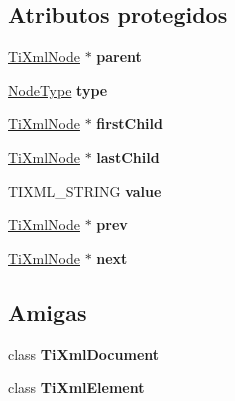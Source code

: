 \subsection*{\-Atributos protegidos}
\begin{DoxyCompactItemize}
\item 
\hypertarget{classTiXmlNode_a662c4de61244e4fa5bd4e2d8c63143a5}{\hyperlink{classTiXmlNode}{\-Ti\-Xml\-Node} $\ast$ {\bfseries parent}}\label{classTiXmlNode_a662c4de61244e4fa5bd4e2d8c63143a5}

\item 
\hypertarget{classTiXmlNode_a2619c6379181c16ba95ae6922e2ca839}{\hyperlink{classTiXmlNode_a836eded4920ab9e9ef28496f48cd95a2}{\-Node\-Type} {\bfseries type}}\label{classTiXmlNode_a2619c6379181c16ba95ae6922e2ca839}

\item 
\hypertarget{classTiXmlNode_af749fb7f22010b80e8f904c32653d50e}{\hyperlink{classTiXmlNode}{\-Ti\-Xml\-Node} $\ast$ {\bfseries first\-Child}}\label{classTiXmlNode_af749fb7f22010b80e8f904c32653d50e}

\item 
\hypertarget{classTiXmlNode_a5b30756d21b304580d22a841ec9d61f8}{\hyperlink{classTiXmlNode}{\-Ti\-Xml\-Node} $\ast$ {\bfseries last\-Child}}\label{classTiXmlNode_a5b30756d21b304580d22a841ec9d61f8}

\item 
\hypertarget{classTiXmlNode_aead528b3cedc33c16a6c539872c7cc8b}{\-T\-I\-X\-M\-L\-\_\-\-S\-T\-R\-I\-N\-G {\bfseries value}}\label{classTiXmlNode_aead528b3cedc33c16a6c539872c7cc8b}

\item 
\hypertarget{classTiXmlNode_a9c5370ea2cbfd9f0e0f7b30a57fd68f5}{\hyperlink{classTiXmlNode}{\-Ti\-Xml\-Node} $\ast$ {\bfseries prev}}\label{classTiXmlNode_a9c5370ea2cbfd9f0e0f7b30a57fd68f5}

\item 
\hypertarget{classTiXmlNode_a2f329cc993d2d34df76e17dcbb776b45}{\hyperlink{classTiXmlNode}{\-Ti\-Xml\-Node} $\ast$ {\bfseries next}}\label{classTiXmlNode_a2f329cc993d2d34df76e17dcbb776b45}

\end{DoxyCompactItemize}
\subsection*{\-Amigas}
\begin{DoxyCompactItemize}
\item 
\hypertarget{classTiXmlNode_a173617f6dfe902cf484ce5552b950475}{class {\bfseries \-Ti\-Xml\-Document}}\label{classTiXmlNode_a173617f6dfe902cf484ce5552b950475}

\item 
\hypertarget{classTiXmlNode_ab6592e32cb9132be517cc12a70564c4b}{class {\bfseries \-Ti\-Xml\-Element}}\label{classTiXmlNode_ab6592e32cb9132be517cc12a70564c4b}

\end{DoxyCompactItemize}


